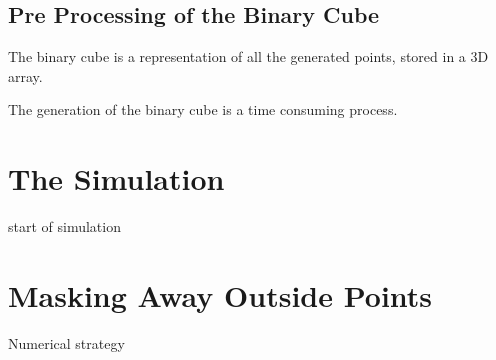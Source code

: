 \subsection{Pre Processing of the Binary Cube}
The binary cube is a representation of all the generated points, stored in a 3D array. 

The generation of the binary cube is a time consuming process. 

\section{The Simulation}
start of simulation

\section{Masking Away Outside Points}
Numerical strategy





